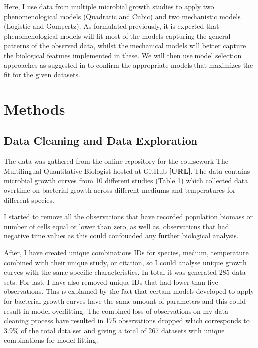 \documentclass[11]{article}
\begin{document}
Here, I use data from multiple microbial growth studies to apply two phenomenological models (Quadratic and Cubic) and two mechanistic models (Logistic and Gompertz). As formulated previously, it is expected that phenomenological models will fit most of the models capturing the general patterns of the observed data, whilst the mechanical models will better capture the biological features implemented in these. We will then use model selection approaches as suggested in \cite{johnson2004model} to confirm the appropriate models that maximizes the fit for the given datasets.


\section{Methods}

\subsection{Data Cleaning and Data Exploration}
The data was gathered from the online repository for the coursework The Multilingual Quantitative Biologist hosted at GitHub \textbf{[URL]}. The data contains microbial growth curves from 10 different studies (Table 1) which collected data overtime on bacterial growth across different mediums and temperatures for different species.


I started to remove all the observations that have recorded population biomass or number of cells equal or lower than zero, as well as, observations that had negative time values as this could confounded any further biological analysis.

After, I have created unique combinations IDs for species, medium, temperature combined with their unique study, or citation, so I could analyse unique growth curves with the same specific characteristics. In total it was generated 285 data sets. For last, I have also removed unique IDs that had lower than five observations. This is explained by the fact that certain models developed to apply for bacterial growth curves have the same amount of parameters and this could result in model overfitting. The combined loss of observations on my data cleaning process have resulted in 175 observations dropped which corresponds to 3.9\% of the total  data set and giving a total of 267 datasets with unique combinations for model fitting.
\end{document}
